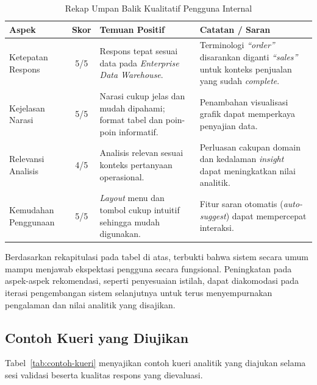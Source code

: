 \begin{table}[htbp]
\centering
\caption{Rekap Umpan Balik Kualitatif Pengguna Internal}
\label{tab:umpan-balik-pengguna}
\begin{tabular}{|p{3.5cm}|c|p{4.5cm}|p{4.5cm}|}
\hline
\textbf{Aspek} & \textbf{Skor} & \textbf{Temuan Positif} & \textbf{Catatan / Saran} \\
\hline
Ketepatan Respons & 5/5 & Respons tepat sesuai data pada \textit{Enterprise Data Warehouse}. & Ter\-mi\-no\-lo\-gi \textit{``order''} di\-sa\-ran\-kan di\-gan\-ti \textit{``sales''} un\-tuk kon\-teks pen\-ju\-a\-lan yang su\-dah \textit{complete}. \\
\hline
Kejelasan Narasi & 5/5 & Narasi cukup jelas dan mudah dipahami; format tabel dan poin-poin informatif. & Pe\-nam\-bah\-an vi\-su\-a\-li\-sa\-si gra\-fik da\-pat mem\-per\-ka\-ya pe\-nya\-ji\-an da\-ta. \\
\hline
Relevansi Analisis & 4/5 & Analisis relevan sesuai konteks pertanyaan operasional. & Per\-lu\-as\-an ca\-kup\-an do\-main dan ke\-da\-lam\-an \textit{insight} da\-pat me\-ning\-kat\-kan ni\-lai ana\-li\-tik. \\
\hline
Kemudahan Penggunaan & 5/5 & \textit{Layout} menu dan tombol cukup intuitif sehingga mudah digunakan. & Fi\-tur sa\-ran oto\-ma\-tis (\textit{auto-suggest}) da\-pat mem\-per\-ce\-pat in\-ter\-ak\-si. \\
\hline
\end{tabular}
\end{table}

Berdasarkan rekapitulasi pada tabel di atas, terbukti bahwa sistem secara umum mampu menjawab ekspektasi pengguna secara fungsional. Peningkatan pada aspek-aspek rekomendasi, seperti penyesuaian istilah, dapat diakomodasi pada iterasi pengembangan sistem selanjutnya untuk terus menyempurnakan pengalaman dan nilai analitik yang disajikan.

\subsection{Contoh Kueri yang Diujikan}

Tabel~\ref{tab:contoh-kueri} menyajikan contoh kueri analitik yang diajukan selama sesi validasi beserta kualitas respons yang dievaluasi.

